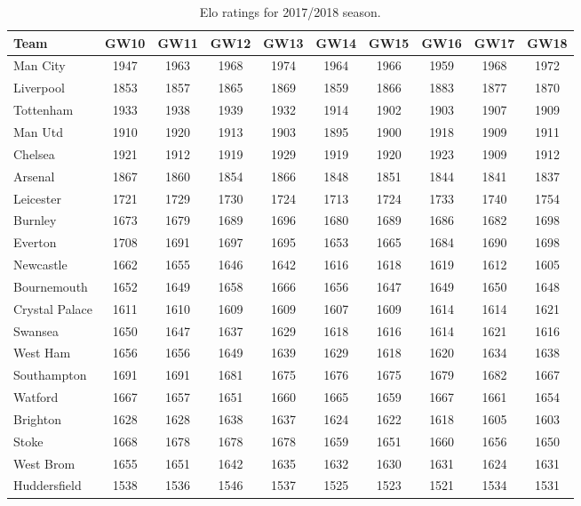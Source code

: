 \begin{table}[H]
\centering
\smaller
\begin{tabular}{|l|c|c|c|c|c|c|c|c|c|}
\hline
Team           & GW10 & GW11 & GW12 & GW13 & GW14 & GW15 & GW16 & GW17 & GW18 \\
\hline
Man City   \Tstrut    & 1947 & 1963 & 1968 & 1974 & 1964 & 1966 & 1959 & 1968 & 1972 \\
Liverpool      & 1853 & 1857 & 1865 & 1869 & 1859 & 1866 & 1883 & 1877 & 1870 \\
Tottenham      & 1933 & 1938 & 1939 & 1932 & 1914 & 1902 & 1903 & 1907 & 1909 \\
Man Utd        & 1910 & 1920 & 1913 & 1903 & 1895 & 1900 & 1918 & 1909 & 1911 \\
Chelsea        & 1921 & 1912 & 1919 & 1929 & 1919 & 1920 & 1923 & 1909 & 1912 \\
Arsenal        & 1867 & 1860 & 1854 & 1866 & 1848 & 1851 & 1844 & 1841 & 1837 \\
Leicester      & 1721 & 1729 & 1730 & 1724 & 1713 & 1724 & 1733 & 1740 & 1754 \\
Burnley        & 1673 & 1679 & 1689 & 1696 & 1680 & 1689 & 1686 & 1682 & 1698 \\
Everton        & 1708 & 1691 & 1697 & 1695 & 1653 & 1665 & 1684 & 1690 & 1698 \\
Newcastle      & 1662 & 1655 & 1646 & 1642 & 1616 & 1618 & 1619 & 1612 & 1605 \\
Bournemouth    & 1652 & 1649 & 1658 & 1666 & 1656 & 1647 & 1649 & 1650 & 1648 \\
Crystal Palace & 1611 & 1610 & 1609 & 1609 & 1607 & 1609 & 1614 & 1614 & 1621 \\
Swansea        & 1650 & 1647 & 1637 & 1629 & 1618 & 1616 & 1614 & 1621 & 1616 \\
West Ham       & 1656 & 1656 & 1649 & 1639 & 1629 & 1618 & 1620 & 1634 & 1638 \\
Southampton    & 1691 & 1691 & 1681 & 1675 & 1676 & 1675 & 1679 & 1682 & 1667 \\
Watford        & 1667 & 1657 & 1651 & 1660 & 1665 & 1659 & 1667 & 1661 & 1654 \\
Brighton       & 1628 & 1628 & 1638 & 1637 & 1624 & 1622 & 1618 & 1605 & 1603 \\
Stoke          & 1668 & 1678 & 1678 & 1678 & 1659 & 1651 & 1660 & 1656 & 1650 \\
West Brom      & 1655 & 1651 & 1642 & 1635 & 1632 & 1630 & 1631 & 1624 & 1631 \\
Huddersfield  \Bstrut & 1538 & 1536 & 1546 & 1537 & 1525 & 1523 & 1521 & 1534 & 1531 \\
\hline
\end{tabular}
\caption{Elo ratings for 2017/2018 season.}
\label{tab:elo_values_gameweeks_2}
\end{table}


